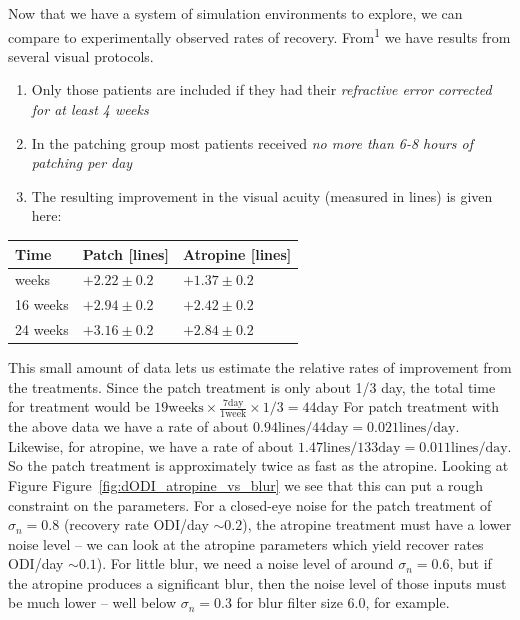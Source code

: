 \documentclass[
]{article}
\providecommand{\tightlist}{%
  \setlength{\itemsep}{0pt}\setlength{\parskip}{0pt}}
\begin{document}
Now that we have a system of simulation environments to explore, we can
compare to experimentally observed rates of recovery.
From\textsuperscript{1} we have results from several visual protocols.

\begin{enumerate}
\def\labelenumi{\arabic{enumi}.}
\tightlist
\item
  Only those patients are included if they had their \emph{refractive
  error corrected for at least 4 weeks}
\item
  In the patching group most patients received \emph{no more than 6-8
  hours of patching per day}
\item
  The resulting improvement in the visual acuity (measured in lines) is
  given here:
\end{enumerate}

\begin{longtable}[]{@{}lll@{}}
\toprule\noalign{}
Time & Patch {[}lines{]} & Atropine {[}lines{]} \\
\midrule\noalign{}
\endhead
\bottomrule\noalign{}
\endlastfoot
5 weeks & \(+2.22 \pm 0.2\) & \(+1.37 \pm 0.2\) \\
16 weeks & \(+2.94 \pm 0.2\) & \(+2.42 \pm 0.2\) \\
24 weeks & \(+3.16 \pm 0.2\) & \(+2.84 \pm 0.2\) \\
\end{longtable}

This small amount of data lets us estimate the relative rates of
improvement from the treatments. Since the patch treatment is only about
1/3 day, the total time for treatment would be
\(19 \text{weeks}\times \frac{7 \text{day}}{1 \text{week}}\times 1/3=44 \text{day}\)
For patch treatment with the above data we have a rate of about
\(0.94 \text{lines} / 44 \text{day}=0.021 \text{lines}/\text{day}\).
Likewise, for atropine, we have a rate of about
\(1.47\text{lines} / 133 \text{day}=0.011 \text{lines}/\text{day}\). So
the patch treatment is approximately twice as fast as the atropine.
Looking at Figure Figure~\ref{fig:dODI_atropine_vs_blur} we see that
this can put a rough constraint on the parameters. For a closed-eye
noise for the patch treatment of \(\sigma_n=0.8\) (recovery rate ODI/day
\(\sim 0.2\)), the atropine treatment must have a lower noise level --
we can look at the atropine parameters which yield recover rates ODI/day
\(\sim 0.1\)). For little blur, we need a noise level of around
\(\sigma_n=0.6\), but if the atropine produces a significant blur, then
the noise level of those inputs must be much lower -- well below
\(\sigma_n=0.3\) for blur filter size 6.0, for example.
\end{document}
